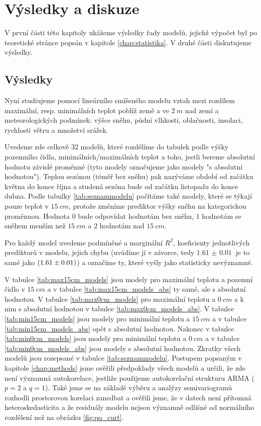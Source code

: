 \chapter{Výsledky a diskuze}\label{chap:ch3}
V první části této kapitoly ukážeme výsledky řady modelů, jejichž výpočet byl po teoretické stránce popsán v kapitole \ref{chap:statistika}. V druhé části diskutujeme výsledky.

\section{Výsledky}
Nyní studiujeme pomocí lineárního smíšeného modelu vztah mezi rozdílem maximální, resp. minimálních teplot poblíž země a ve $\SI{2}{m}$ nad zemí a meteorologických podmínek: výšce sněhu, půdní vlhkosti, oblačnosti, insolaci, rychlosti větru a množství srážek.

Uvedeme zde celkově 32 modelů, které rozdělíme do tabulek podle výšky pozemního čidla, minimálních/maximálních teplot a toho, jestli bereme absolutní hodnotu závislé proměnné (tyto modely označujeme jako modely "s absolutní hodnotou"). Teplou sezónou (téměř bez sněhu) pak nazýváme období od začátku května do konce října a studená sezóna bude od začátku listopadu do konce dubna. Podle tabulky \ref{tab:seznammodelu} počítáme také modely, které se týkají pouze teplot v $\SI{15}{cm}$, protože změníme prediktor výšky sněhu na kategorickou proměnnou. Hodnota $0$ bude odpovídat hodnotám bez sněhu, $1$ hodnotám se sněhem menším než $\SI{15}{cm}$ a $2$ hodnotám nad $\SI{15}{cm}$.

Pro každý model uvedeme podmíněné a marginální $R^2$, koeficienty jednotlivých prediktorů v modelu, jejich chybu (uvádíme jí v závorce, tedy $\SI{1.61(1)}{}$ je to samé jako $\SI[separate-uncertainty = true]{1.61\pm 0.01}{}$) a označíme ty, které vyšly jako statisticky nevýznamné.

V tabulce \ref{tab:max15cm_models} jsou modely pro maximální teplotu a pozemní čidlo v $\SI{15}{cm}$ a v tabulce \ref{tab:max15cm_models_abs} ty samé, ale s absolutní hodnotou. V tabulce \ref{tab:max0cm_models} pro maximální teplotu a $\SI{0}{cm}$ a k nim s absolutní hodnotou v tabulce \ref{tab:max0cm_models_abs}. V tabulce \ref{tab:min15cm_models} jsou modely pro minimální teplotu a $\SI{15}{cm}$ a v tabulce \ref{tab:min15cm_models_abs} opět s absolutní hodnotou. Nakonec v tabulce \ref{tab:min0cm_models} jsou modely pro minimální teplotu a $\SI{0}{cm}$ a v tabulce \ref{tab:min0cm_models_abs} jsou modely s absolutní hodnotou. Zkratky všech modelů jsou rozepsané v tabulce \ref{tab:seznammodelu}. Postupem popsaným v kapitole \ref{chap:methods} jsme ověřili předpoklady všech modelů a určili, že zde není významná autokorelace, jestliže použijeme autokorelační strukturu ARMA ($p=2$ a $q=1$). Také jsme se na základě výběru a analýzy semivariogramů rozhodli prostorovou korelaci zanedbat a ověřili jsme, že v datech není přítomná heteroskedasticita a že residuály modelu nejsou významně odlišné od normálního rozdělení než na obrázku \ref{fig:qq_curt}.


